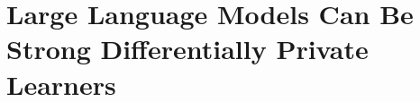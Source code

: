 \chapter[Language Models Can Be Strong Differentially Private Learners]{\LARGE Large Language Models Can Be Strong Differentially Private Learners}\label{ch_3}

% 







